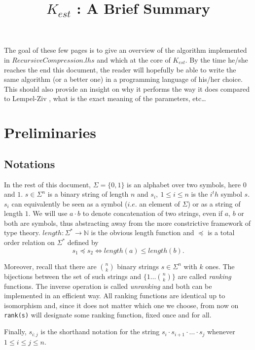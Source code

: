 \documentclass[12pt]{amsart}
\title{$K_{est}$ : A Brief Summary}
\author{}
\date{}
\theoremstyle{definition}
\theoremstyle{remark}
\theoremstyle{definition}
\theoremstyle{remark}
\begin{document}
	\maketitle

	The goal of these few pages is to give an overview of the algorithm implemented in $RecursiveCompression.lhs$ and which at the core
	of $K_{est}$. By the time he/she reaches the end this document, the reader will hopefully be able to write the same algorithm (or a better one) in a programming 
	language of his/her choice. This should also provide an insight on why it performs the way it does compared to Lempel-Ziv \cite{LZ},
	what is the exact meaning of the parameters, etc\dots

	\section*{Preliminaries}


	\subsection*{Notations}

		In the rest of this document, $\Sigma = \{0,1\}$ is an alphabet over two symbols, here $0$ and $1$. $s \in \Sigma^n$ is a binary string
		of length $n$ and $s_i,~1 \leq i \leq n$ is the $i^th$ symbol $s$. $s_i$ can equivalently be seen as a symbol ($i.e.$ an element
		of $\Sigma$) or as a string of length $1$. We will use $a \cdot b$ to denote concatenation of two strings, even if $a$, $b$ or both 
		are symbols, thus abstracting away from the more constrictive framework of type theory. $length : \Sigma^\ast \to \mathbb{N}$ is
		the obvious length function and $\preceq$ is a total order relation on
		$\Sigma^\ast$ defined by
		\[ s_1 \preceq s_2 \Leftrightarrow length(a) \leq length(b).\]
		
		Moreover, recall that there are ${n \choose k}$ binary strings $s \in \Sigma^n$ with $k$ ones. The bijections between
		the set of such strings and $\{1\dots {n \choose k}\}$ are called \emph{ranking} functions. The inverse operation is called
		\emph{unranking} and both can be implemented in an efficient way. All ranking functions are identical up to 
		isomorphism and, since it does not matter which one we choose, from now on \texttt{rank(s)} will designate some ranking function, fixed once and for all.

		Finally, $s_{i:j}$ is the shorthand notation
		for the string $s_i \cdot s_{i+1} \cdot \dots \cdot s_{j}$ whenever $1 \leq i \leq j \leq n$.
\end{document}
